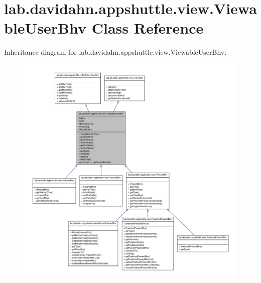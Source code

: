\hypertarget{classlab_1_1davidahn_1_1appshuttle_1_1view_1_1_viewable_user_bhv}{\section{lab.\-davidahn.\-appshuttle.\-view.\-Viewable\-User\-Bhv \-Class \-Reference}
\label{classlab_1_1davidahn_1_1appshuttle_1_1view_1_1_viewable_user_bhv}
}


\-Inheritance diagram for lab.\-davidahn.\-appshuttle.\-view.\-Viewable\-User\-Bhv\-:
\nopagebreak
\begin{figure}[H]
\begin{center}
\leavevmode
\includegraphics[width=350pt]{classlab_1_1davidahn_1_1appshuttle_1_1view_1_1_viewable_user_bhv__inherit__graph}
\end{center}
\end{figure}


